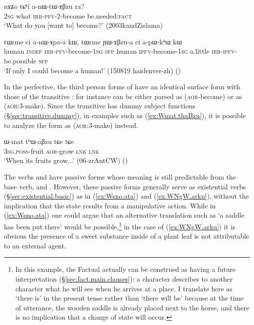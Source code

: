  \begin{exe}
\ex \label{ex:anWtABzu}
 \gll nɤʑo tɕʰi a-nɯ-tɯ-ɤβzu ra? \\
 \textsc{2sg} what \textsc{irr}-\textsc{pfv}-2-become be.needed:\textsc{fact} \\
 \glt `What do you [want to] become?' (2003kandZislama)
\end{exe}

 \begin{exe}
\ex \label{ex:anApa}
 \gll tɯrme ci a-nɯ-ɤpa-a kɯ, tɯrme ɲɯ-ɤβzu-a ci a-pɯ-kʰɯ kɯ \\
 human \textsc{indef} \textsc{irr}-\textsc{pfv}-become-\textsc{1sg} \textsc{sfp} human \textsc{ipfv}-become-\textsc{1sg} a.little \textsc{irr}-\textsc{ipfv}-be.possible \textsc{sfp} \\
 \glt `If only I could become a human!' (150819 haidenver-zh)
()
 \end{exe}
 
In the perfective, the third person forms of   have an identical surface form with those of the transitive : for instance  can be either parsed as  (\textsc{aor}-become) or as  (\textsc{aor}:3\flobv{}-make). Since the transitive  has dummy subject functions (§\ref{sec:transitive.dummy}), in examples such as (\ref{ex:Wmat.thaBzu}), it is possible to analyze  the form  as    (\textsc{aor}:3\flobv{}-make) instead.
 
\begin{exe}
\ex \label{ex:Wmat.thaBzu}
 \gll ɯ-mat tʰɯ-aβzu tɕe tɕe \\
 \textsc{3sg}.\textsc{poss}-fruit \textsc{aor}-grow \textsc{lnk} \textsc{lnk} \\
 \glt `When its fruits grow...' (06-zrAntCW) ()
\end{exe}
  
The verbs  and  have passive forms whose meaning is still predictable from the base verb,    and .  However, these passive forms generally serve as existential verbs (§\ref{sec:existential.basic}) as in (\ref{ex:Wsno.ata}) and (\ref{ex:WNgW.arku}), without the implication that the state results from a manipulative action. While in (\ref{ex:Wsno.ata}) one could argue that an alternative translation such as `a saddle has been put there' would be possible,\footnote{In this example, the Factual actually can be construed as having a future interpretation (§\ref{sec:fact.main.clauses}): a character describes to another character what he will see when he arrives at a place. I translate here  as `there is' in the present tense rather than `there will be' because at the time of utterance, the wooden saddle is already placed next to the horse, and there is no implication that a change of state will occur. }  in the case of (\ref{ex:WNgW.arku}) it is obvious the presence of a sweet substance inside of a plant leaf is not attributable to an external agent. 
 
